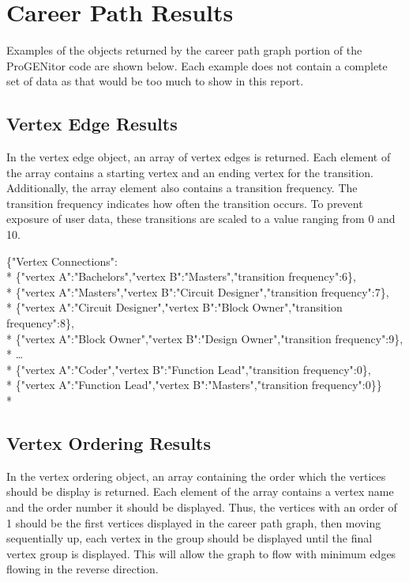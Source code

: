\section{Career Path Results}
\label{sect:career-path-results}
Examples of the objects returned by the career path graph portion of the
ProGENitor code are shown below.  Each example does not contain a complete set
of data as that would be too much to show in this report.

\subsection{Vertex Edge Results}
In the vertex edge object, an array of vertex edges is returned.  Each element
of the array contains a starting vertex and an ending vertex for the transition. 
Additionally, the array element also contains a transition frequency.  The
transition frequency indicates how often the transition occurs.  To
prevent exposure of user data, these transitions are scaled to a value
ranging from 0 and 10.

\begin{tt}
\begin{footnotesize}
\noindent\{"Vertex Connections":\\*
\{"vertex A":"Bachelors","vertex B":"Masters","transition frequency":6\},\\*
\{"vertex A":"Masters","vertex 	B":"Circuit Designer","transition frequency":7\},\\*
\{"vertex A":"Circuit Designer","vertex B":"Block 	Owner","transition
 frequency":8\},\\* 
\{"vertex A":"Block Owner","vertex B":"Design Owner","transition frequency":9\},\\*
\ldots\\* 
\{"vertex A":"Coder","vertex B":"Function Lead","transition frequency":0\},\\*
\{"vertex A":"Function Lead","vertex B":"Masters","transition frequency":0\}\}\\*
\end{footnotesize}
\end{tt}


\subsection{Vertex Ordering Results}
In the vertex ordering object, an array containing the order which the vertices
should be display is returned.  Each element of the array contains a vertex name
and the order number it should be displayed.  Thus, the vertices with an order
of 1 should be the first vertices displayed in the career path graph, then
moving sequentially up, each vertex in the group should be displayed until the
final vertex group is displayed.  This will allow the graph to flow with minimum
edges flowing in the reverse direction.


